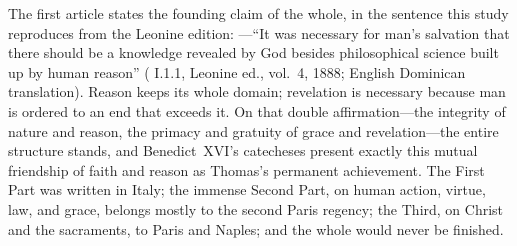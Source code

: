 The first article states the founding claim of the whole, in the sentence
this study reproduces from the Leonine edition: ---``It was necessary for man's salvation
that there should be a knowledge revealed by God besides philosophical
science built up by human reason'' ( I.1.1,
Leonine ed., vol.~4, 1888; English Dominican translation). Reason keeps
its whole domain; revelation is necessary because man is ordered to an
end that exceeds it. On that double affirmation---the integrity of nature
and reason, the primacy and gratuity of grace and revelation---the entire
structure stands, and Benedict~XVI's catecheses present exactly this
mutual friendship of faith and reason as Thomas's permanent achievement.
The First Part was written in Italy; the immense Second Part, on human
action, virtue, law, and grace, belongs mostly to the second Paris
regency; the Third, on Christ and the sacraments, to Paris and Naples;
and the whole would never be finished.
